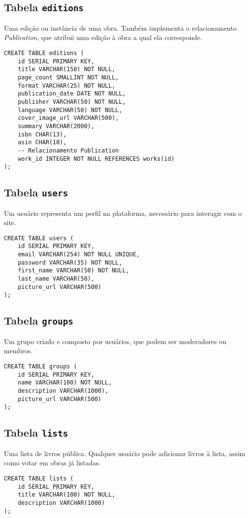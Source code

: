 \documentclass[12pt]{article}
\begin{document}
\subsection{Tabela \texttt{editions}}
Uma edição ou instância de uma obra. Também implementa o relacionamento \textit{Publication}, que atribui uma edição à obra a qual ela corresponde.
\begin{lstlisting}
CREATE TABLE editions (
    id SERIAL PRIMARY KEY,
    title VARCHAR(150) NOT NULL,
    page_count SMALLINT NOT NULL,
    format VARCHAR(25) NOT NULL,
    publication_date DATE NOT NULL,
    publisher VARCHAR(50) NOT NULL,
    language VARCHAR(50) NOT NULL,
    cover_image_url VARCHAR(500),
    summary VARCHAR(2000),
    isbn CHAR(13),
    asin CHAR(10),
    -- Relacionamento Publication
    work_id INTEGER NOT NULL REFERENCES works(id)
);
\end{lstlisting}

\newpage

\subsection{Tabela \texttt{users}}
Um usuário representa um perfil na plataforma, necessário para interagir com o site.
\begin{lstlisting}
CREATE TABLE users (
    id SERIAL PRIMARY KEY,
    email VARCHAR(254) NOT NULL UNIQUE,
    password VARCHAR(35) NOT NULL,
    first_name VARCHAR(50) NOT NULL,
    last_name VARCHAR(50),
    picture_url VARCHAR(500)
);
\end{lstlisting}

\subsection{Tabela \texttt{groups}}
Um grupo criado e composto por usuários, que podem ser moderadores ou membros.
\begin{lstlisting}
CREATE TABLE groups (
    id SERIAL PRIMARY KEY,
    name VARCHAR(100) NOT NULL,
    description VARCHAR(1000),
    picture_url VARCHAR(500)
);
\end{lstlisting}

\subsection{Tabela \texttt{lists}}
Uma lista de livros pública. Qualquer usuário pode adicionar livros à lista, assim como votar em obras já listadas.
\begin{lstlisting}
CREATE TABLE lists (
    id SERIAL PRIMARY KEY,
    title VARCHAR(100) NOT NULL,
    description VARCHAR(1000)
);
\end{lstlisting}
\end{document}
